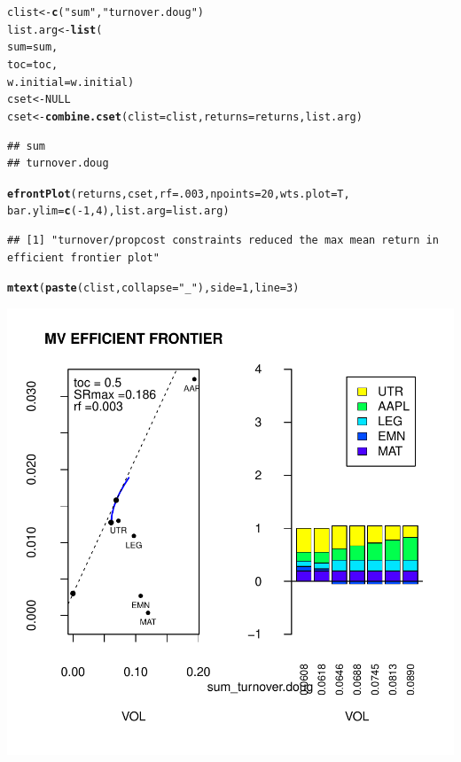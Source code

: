 \documentclass{uwstat518}\usepackage[]{graphicx}\usepackage[]{color}
\makeatletter
\def\maxwidth{ %
  \ifdim\Gin@nat@width>\linewidth
    \linewidth
  \else
    \Gin@nat@width
  \fi
}
\newcommand{\hlstr}[1]{\textcolor[rgb]{0.192,0.494,0.8}{#1}}%
\newcommand{\hlkwd}[1]{\textcolor[rgb]{0.737,0.353,0.396}{\textbf{#1}}}%
\newenvironment{kframe}{%
 \def\at@end@of@kframe{}%
 \ifinner\ifhmode%
  \def\at@end@of@kframe{\end{minipage}}%
  \begin{minipage}{\columnwidth}%
 \fi\fi%
 \def\FrameCommand##1{\hskip\@totalleftmargin \hskip-\fboxsep
 \colorbox{shadecolor}{##1}\hskip-\fboxsep
     \hskip-\linewidth \hskip-\@totalleftmargin \hskip\columnwidth}%
 \MakeFramed {\advance\hsize-\width
   \@totalleftmargin\z@ \linewidth\hsize
   \@setminipage}}%
 {\par\unskip\endMakeFramed%
 \at@end@of@kframe}
\newenvironment{knitrout}{}{} %
\makeatother
\begin{document}
\begin{knitrout}
\begin{kframe}\begin{alltt}


clist <- \hlkwd{c}(\hlstr{"sum"},\hlstr{"turnover.doug"})
list.arg <- \hlkwd{list}(	
		sum=sum,
		toc=toc,
		w.initial=w.initial)
cset <- NULL
cset <-\hlkwd{combine.cset}(clist=clist,returns=returns,list.arg)
\end{alltt}
\begin{verbatim}
## sum 
## turnover.doug
\end{verbatim}
\begin{alltt}

\hlkwd{efrontPlot}(returns, cset, rf = .003, npoints = 20,wts.plot = T,
		bar.ylim = \hlkwd{c}(-1,4),list.arg=list.arg)
\end{alltt}
\begin{verbatim}
## [1] "turnover/propcost constraints reduced the max mean return in efficient frontier plot"
\end{verbatim}
\begin{alltt}
\hlkwd{mtext}(\hlkwd{paste}(clist,collapse=\hlstr{"_"}),side=1,line=3)
\end{alltt}
\end{kframe}
\includegraphics[width=\maxwidth]{figure/unnamed-chunk-62} 

\end{knitrout}
\end{document}
